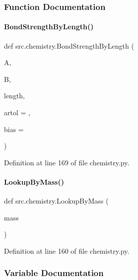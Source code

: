 \subsubsection{Function Documentation}
\mbox{\label{namespacesrc_1_1chemistry_af789b97935f83fc42345ad5b07a11174}} 
\paragraph{\texorpdfstring{Bond\+Strength\+By\+Length()}{BondStrengthByLength()}}
{\footnotesize\ttfamily def src.\+chemistry.\+Bond\+Strength\+By\+Length (\begin{DoxyParamCaption}\item[{}]{A,  }\item[{}]{B,  }\item[{}]{length,  }\item[{}]{artol = {},  }\item[{}]{bias = {} }\end{DoxyParamCaption})}



Definition at line 169 of file chemistry.\+py.

\mbox{\label{namespacesrc_1_1chemistry_a50b3f355bb12e82be0dbb81daac82e3e}} 
\paragraph{\texorpdfstring{Lookup\+By\+Mass()}{LookupByMass()}}
{\footnotesize\ttfamily def src.\+chemistry.\+Lookup\+By\+Mass (\begin{DoxyParamCaption}\item[{}]{mass }\end{DoxyParamCaption})}



Definition at line 160 of file chemistry.\+py.



\subsubsection{Variable Documentation}
\mbox{\label{namespacesrc_1_1chemistry_aa6456b6409fde4637bee2fb18999d881}} 
